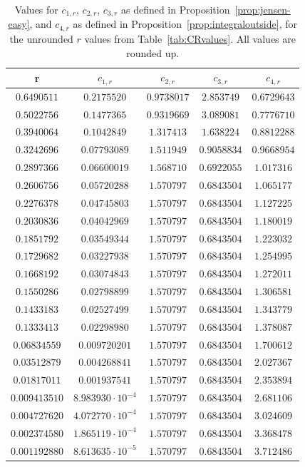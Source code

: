 \documentclass[10pt,english,letter, reqno]{amsart}
\theoremstyle{plain}
\theoremstyle{definition}
\begin{document}
\begin{table}
\caption{Values for $c_{1,r}$, $c_{2,r}$, $c_{3,r}$ as defined in Proposition~\ref{prop:jensen-easy}, and $c_{4,r}$ as defined in Proposition~\ref{prop:integraloutside}, for the unrounded $r$ values from Table~\ref{tab:CRvalues}. All values are rounded up.}\label{tab:crvalues2}
\begin{tabular}{|c|cccc|}
\hline
r  & $c_{1,r}$& $c_{2,r}$& $c_{3,r}$& $c_{4,r}$\\
\hline
$0.6490511$&$0.2175520$&$0.9738017$&$2.853749$&$0.6729643$\\
$0.5022756$&$0.1477365$&$0.9319669$&$3.089081$&$0.7776710$\\
$0.3940064$&$0.1042849$&$1.317413$&$1.638224$&$0.8812288$\\
$0.3242696$&$0.07793089$&$1.511949$&$0.9058834$&$0.9668954$\\
$0.2897366$&$0.06600019$&$1.568710$&$0.6922055$&$1.017316$\\
$0.2606756$&$0.05720288$&$1.570797$&$0.6843504$&$1.065177$\\
$0.2276378$&$0.04745803$&$1.570797$&$0.6843504$&$1.127225$\\
$0.2030836$&$0.04042969$&$1.570797$&$0.6843504$&$1.180019$\\
$0.1851792$&$0.03549344$&$1.570797$&$0.6843504$&$1.223032$\\
$0.1729682$&$0.03227938$&$1.570797$&$0.6843504$&$1.254995$\\
$0.1668192$&$0.03074843$&$1.570797$&$0.6843504$&$1.272011$\\
$0.1550286$&$0.02798899$&$1.570797$&$0.6843504$&$1.306581$\\
$0.1433183$&$0.02527499$&$1.570797$&$0.6843504$&$1.343779$\\
$0.1333413$&$0.02298980$&$1.570797$&$0.6843504$&$1.378087$\\
$0.06834559$&$0.009720201$&$1.570797$&$0.6843504$&$1.700612$\\
$0.03512879$&$0.004268841$&$1.570797$&$0.6843504$&$2.027367$\\
$0.01817011$&$0.001937541$&$1.570797$&$0.6843504$&$2.353894$\\
$0.009413510$&$8.983930\cdot 10^{-4}$&$1.570797$&$0.6843504$&$2.681106$\\
$0.004727620$&$4.072770\cdot 10^{-4}$&$1.570797$&$0.6843504$&$3.024609$\\
$0.002374580$&$1.865119\cdot 10^{-4}$&$1.570797$&$0.6843504$&$3.368478$\\
$0.001192880$&$8.613635\cdot 10^{-5}$&$1.570797$&$0.6843504$&$3.712486$\\
\hline
\end{tabular}
\end{table}
\end{document}
